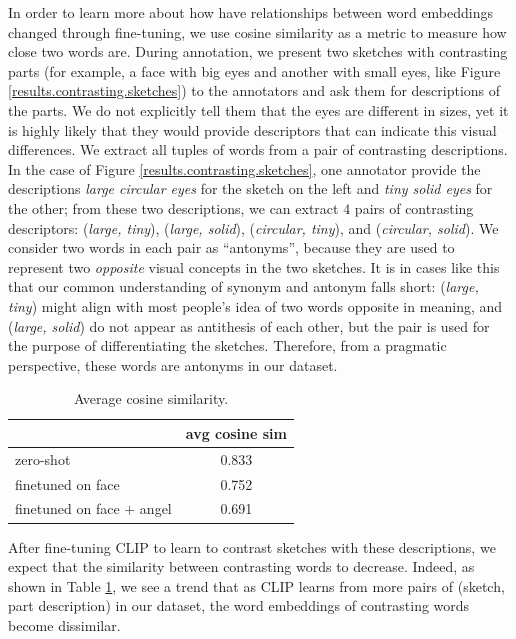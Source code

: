 In order to learn more about how have relationships between word embeddings changed through fine-tuning, we use cosine similarity as a metric to measure how close two words are. During annotation, we present two sketches with contrasting parts (for example, a face with big eyes and another with small eyes, like Figure \ref{results.contrasting.sketches}) to the annotators and ask them for descriptions of the parts. We do not explicitly tell them that the eyes are different in sizes, yet it is highly likely that they would provide descriptors that can indicate this visual differences.  
We extract all tuples of words from a pair of contrasting descriptions. In the case of Figure \ref{results.contrasting.sketches}, one annotator provide the descriptions \textit{large circular eyes} for the sketch on the left and \textit{tiny solid eyes} for the other; from these two descriptions, we can extract $4$ pairs of contrasting descriptors: (\textit{large, tiny}), (\textit{large, solid}), (\textit{circular, tiny}), and (\textit{circular, solid}). 
We consider two words in each pair as ``antonyms'', because they are used to represent two \textit{opposite} visual concepts in the two sketches.   
It is in cases like this that our common understanding of synonym and antonym falls short: (\textit{large, tiny}) might align with most people's idea of two words opposite in meaning, and (\textit{large, solid}) do not appear as antithesis of each other, but the pair is used for the purpose of differentiating the sketches. Therefore, from a pragmatic perspective, these words are antonyms in our dataset. 

\begin{table}[htb!]
\begin{minipage}{1\textwidth}
\begin{center}
{\small
\begin{tabular}{l|c}
\toprule
~ & avg cosine sim \\
\midrule 
zero-shot & 0.833 \\
finetuned on face & 0.752 \\
finetuned on face $+$ angel & 0.691 \\
\bottomrule
\end{tabular}}
\caption{Average cosine similarity.}
\label{results.wordsim}
\end{center}
\end{minipage} 
\end{table}

After fine-tuning CLIP to learn to contrast sketches with these descriptions, we expect that the similarity between contrasting words to decrease. Indeed, as shown in Table \ref{results.wordsim}, we see a trend that as CLIP learns from more pairs of (sketch, part description) in our dataset, the word embeddings of contrasting words become dissimilar.  

